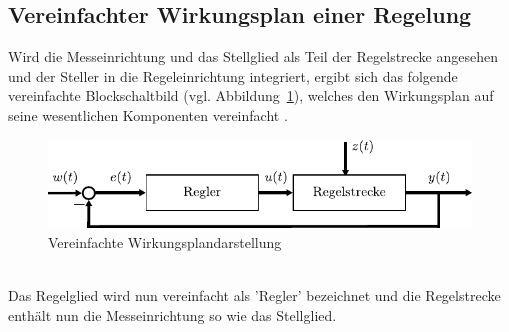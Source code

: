 \subsection{Vereinfachter Wirkungsplan einer Regelung}
%
Wird die Messeinrichtung und das Stellglied als Teil der Regelstrecke angesehen und der Steller in die Regeleinrichtung integriert, ergibt sich das folgende vereinfachte Blockschaltbild (vgl. Abbildung~\ref{fig:regelkreiseinfach}), welches den Wirkungsplan auf seine wesentlichen Komponenten vereinfacht \cite{MSF05}. 
%
\begin{figure}[h]
	\centering
	\includegraphics[width=0.9\linewidth]{Abbildungen/Grundbegriffe/PDF/VereinfWirkungsplan.pdf}
	\caption{Vereinfachte Wirkungsplandarstellung}
	\label{fig:regelkreiseinfach}
\end{figure}\\ 
%
Das Regelglied wird nun vereinfacht als 'Regler' bezeichnet und die Regelstrecke enthält nun die Messeinrichtung so wie das Stellglied.
%
